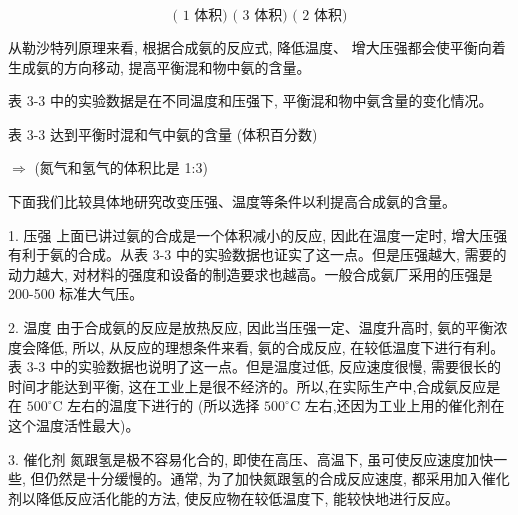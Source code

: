 \documentclass[10pt]{article}
\begin{document}
\[
\text{( 1 体积) ( 3 体积) ( 2 体积)}
\]

从勒沙特列原理来看, 根据合成氨的反应式, 降低温度、 增大压强都会使平衡向着生成氨的方向移动, 提高平衡混和物中氨的含量。

表 3-3 中的实验数据是在不同温度和压强下, 平衡混和物中氨含量的变化情况。

表 3-3 达到平衡时混和气中氨的含量 (体积百分数)

\(\Rightarrow\) (氮气和氢气的体积比是 1:3)

\begin{center}
\end{center}

下面我们比较具体地研究改变压强、温度等条件以利提高合成氨的含量。

1. 压强 上面已讲过氨的合成是一个体积减小的反应, 因此在温度一定时, 增大压强有利于氨的合成。从表 3-3 中的实验数据也证实了这一点。但是压强越大, 需要的动力越大, 对材料的强度和设备的制造要求也越高。一般合成氨厂采用的压强是 200-500 标准大气压。

2. 温度 由于合成氨的反应是放热反应, 因此当压强一定、温度升高时, 氨的平衡浓度会降低, 所以, 从反应的理想条件来看, 氨的合成反应, 在较低温度下进行有利。表 3-3 中的实验数据也说明了这一点。但是温度过低, 反应速度很慢, 需要很长的时间才能达到平衡, 这在工业上是很不经济的。所以,在实际生产中,合成氨反应是在 \({500}^{ \circ }\mathrm{C}\) 左右的温度下进行的 (所以选择 \({500}^{ \circ }\mathrm{C}\) 左右,还因为工业上用的催化剂在这个温度活性最大)。

3. 催化剂 氮跟氢是极不容易化合的, 即使在高压、高温下, 虽可使反应速度加快一些, 但仍然是十分缓慢的。通常, 为了加快氮跟氢的合成反应速度, 都采用加入催化剂以降低反应活化能的方法, 使反应物在较低温度下, 能较快地进行反应。
\end{document}
